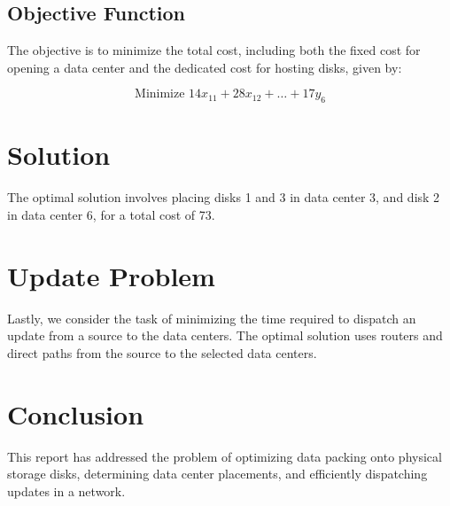 \documentclass{article}
\begin{document}
\subsection{Objective Function}

The objective is to minimize the total cost, including both the fixed cost for opening a data center and the dedicated cost for hosting disks, given by:

\[
\text{Minimize } 14 x_{11} + 28 x_{12} + \dots + 17 y_6
\]

\section{Solution}

The optimal solution involves placing disks 1 and 3 in data center 3, and disk 2 in data center 6, for a total cost of 73.

\section{Update Problem}

Lastly, we consider the task of minimizing the time required to dispatch an update from a source to the data centers. The optimal solution uses routers and direct paths from the source to the selected data centers.

\section{Conclusion}

This report has addressed the problem of optimizing data packing onto physical storage disks, determining data center placements, and efficiently dispatching updates in a network.
\end{document}
